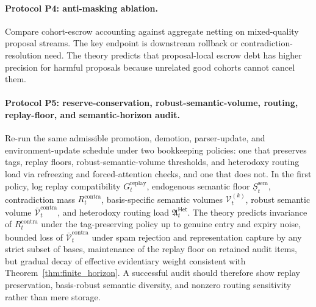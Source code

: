 \documentclass[11pt]{article}
\theoremstyle{definition}
\newcommand{\1}{\mathbf{1}}
\newcommand{\Het}{\mathsf{Het}}
\begin{document}
\paragraph{Protocol P4: anti-masking ablation.} Compare cohort-escrow accounting against aggregate netting on mixed-quality proposal streams. The key endpoint is downstream rollback or contradiction-resolution need. The theory predicts that proposal-local escrow debt has higher precision for harmful proposals because unrelated good cohorts cannot cancel them.

\paragraph{Protocol P5: reserve-conservation, robust-semantic-volume, routing, replay-floor, and semantic-horizon audit.} Re-run the same admissible promotion, demotion, parser-update, and environment-update schedule under two bookkeeping policies: one that preserves tags, replay floors, robust-semantic-volume thresholds, and heterodoxy routing load via refreezing and forced-attention checks, and one that does not. In the first policy, log replay compatibility $G_t^{\mathrm{replay}}$, endogenous semantic floor $\underline S_t^{\mathrm{sem}}$, contradiction mass $R_t^{\mathrm{contra}}$, basis-specific semantic volumes $\mathcal V_t^{(k)}$, robust semantic volume $\bar{\mathcal V}_t^{\mathrm{contra}}$, and heterodoxy routing load $\mathfrak A_t^{\Het}$. The theory predicts invariance of $R_t^{\mathrm{contra}}$ under the tag-preserving policy up to genuine entry and expiry noise, bounded loss of $\bar{\mathcal V}_t^{\mathrm{contra}}$ under spam rejection and representation capture by any strict subset of bases, maintenance of the replay floor on retained audit items, but gradual decay of effective evidentiary weight consistent with Theorem~\ref{thm:finite_horizon}. A successful audit should therefore show replay preservation, basis-robust semantic diversity, and nonzero routing sensitivity rather than mere storage.
\end{document}
